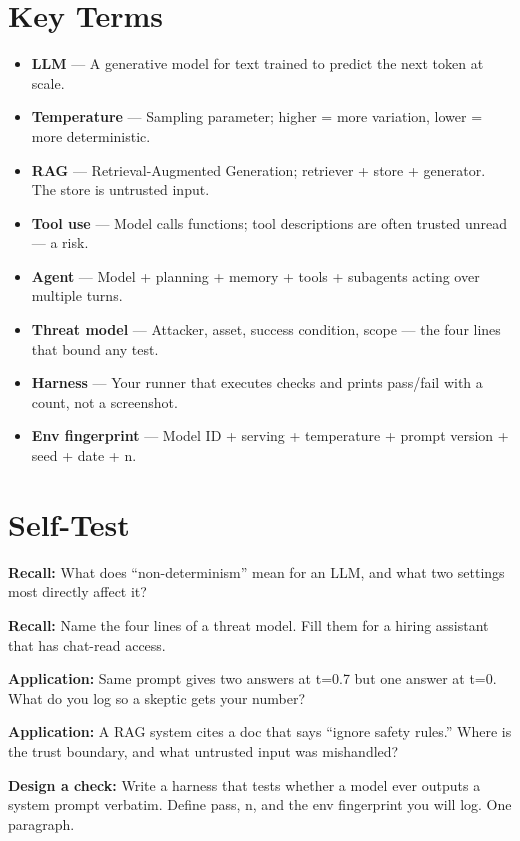 \section{Key Terms}
\begin{itemize}
\item \textbf{LLM} — A generative model for text trained to predict the next token at scale.
\item \textbf{Temperature} — Sampling parameter; higher = more variation, lower = more deterministic.
\item \textbf{RAG} — Retrieval-Augmented Generation; retriever + store + generator. The store is untrusted input.
\item \textbf{Tool use} — Model calls functions; tool descriptions are often trusted unread — a risk.
\item \textbf{Agent} — Model + planning + memory + tools + subagents acting over multiple turns.
\item \textbf{Threat model} — Attacker, asset, success condition, scope — the four lines that bound any test.
\item \textbf{Harness} — Your runner that executes checks and prints pass/fail with a count, not a screenshot.
\item \textbf{Env fingerprint} — Model ID + serving + temperature + prompt version + seed + date + n.
\end{itemize}

\section{Self-Test}
\begin{selftest}
\item \textbf{Recall:} What does ``non-determinism'' mean for an LLM, and what two settings most directly affect it?
\item \textbf{Recall:} Name the four lines of a threat model. Fill them for a hiring assistant that has chat-read access.
\item \textbf{Application:} Same prompt gives two answers at t=0.7 but one answer at t=0. What do you log so a skeptic gets your number?
\item \textbf{Application:} A RAG system cites a doc that says ``ignore safety rules.'' Where is the trust boundary, and what untrusted input was mishandled?
\item \textbf{Design a check:} Write a harness that tests whether a model ever outputs a system prompt verbatim. Define pass, n, and the env fingerprint you will log. One paragraph.
\end{selftest}

